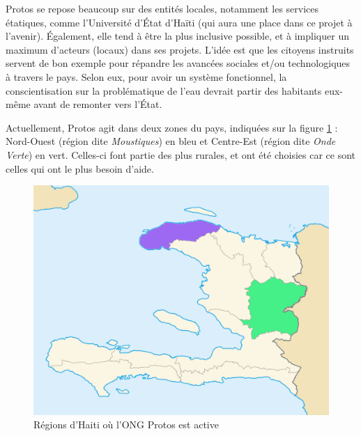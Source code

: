 \documentclass{EPL-master-thesis-covers-FR}
\begin{document}
				Protos se repose beaucoup sur des entités locales, notamment les services étatiques, comme l'Université d'\'Etat d'Haïti (qui aura une place dans ce projet à l'avenir). \'Egalement, elle tend à être la plus inclusive possible, et à impliquer un maximum d'acteurs (locaux) dans ses projets. L'idée est que les citoyens instruits servent de bon exemple pour répandre les avancées sociales et/ou technologiques à travers le pays. Selon eux, pour avoir un système fonctionnel, la conscientisation sur la problématique de l'eau devrait partir des habitants eux-même avant de remonter vers l'\'Etat.


				Actuellement, Protos agit dans deux zones du pays, indiquées sur la figure \ref{fig:carte_haiti_color} : Nord-Ouest (région dite \emph{Moustiques}) en bleu et Centre-Est (région dite \emph{Onde Verte}) en vert. Celles-ci font partie des plus rurales, et ont été choisies car ce sont celles qui ont le plus besoin d'aide.

				\begin{figure}[ht]
					\includegraphics[width=\textwidth]{images/carte_regions_haiti_color}
					\caption{Régions d'Haiti où l'ONG Protos est active}
					\label{fig:carte_haiti_color}
				\end{figure}
\end{document}
